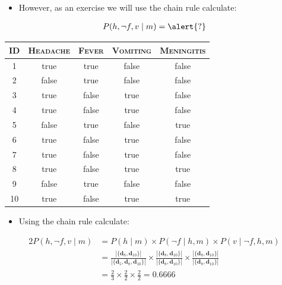 \documentclass[xcolor={table}]{beamer}
\newcommand{\featN}[1]{\textsc{#1}}
\begin{document}
 \begin{frame} 
 \begin{itemize}
	\item However, as an exercise we will use the chain rule calculate:
\end{itemize}
\begin{alignat*}{2}
P(h, \lnot f, v\mid m)&=\alert{?}\\ 
\end{alignat*}
\begin{table}[!tb]
\centering
\begin{footnotesize}
\begin{tabular}{ccccc}
\hline
\featN{ID} & \featN{Headache} & \featN{Fever} & \featN{Vomiting} & \featN{Meningitis}\\
\hline
1 & true & true & false & false\\
2 & false & true & false & false\\
3 & true & false & true & false\\
4 & true & false & true & false\\
5 & false & true & false & true\\
6 & true & false & true & false\\
7 & true & false & true & false\\
8 & true & false & true & true\\
9 & false & true & false & false\\
10 & true & false & true & true\\
\hline
\end{tabular}
\end{footnotesize}
\end{table}
\end{frame} 


 \begin{frame} 
 \begin{itemize}
	\item Using the chain rule calculate:
\end{itemize}
\begin{alignat*}{2}
P(h, \lnot f, v\mid m)&=P(h\mid m)  \times P(\lnot f \mid h,m) \times P(v \mid \lnot f, h,m)\\
&=\frac{\left| \{ \mathbf{d}_8, \mathbf{d}_{10} \} \right|}{\left| \{ \mathbf{d}_5, \mathbf{d}_8, \mathbf{d}_{10} \} \right|} \times  \frac{\left| \{ \mathbf{d}_8, \mathbf{d}_{10} \} \right|}{\left| \{ \mathbf{d}_8, \mathbf{d}_{10} \} \right|} \times \frac{\left| \{ \mathbf{d}_8, \mathbf{d}_{10} \} \right|}{\left| \{ \mathbf{d}_8, \mathbf{d}_{10} \} \right|}\\ 
&=\frac{2}{3} \times  \frac{2}{2} \times \frac{2}{2} = 0.6666\\ 
\end{alignat*}
\end{frame} 
\end{document}
